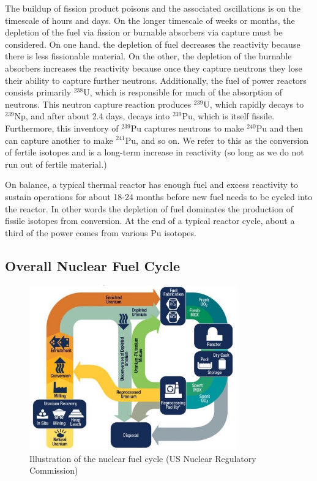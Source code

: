 The buildup of fission product poisons and the associated oscillations is on the timescale of hours and days. On the longer timescale of weeks or months, the depletion of the fuel via fission or burnable absorbers via capture must be considered. On one hand. the depletion of fuel decreases the reactivity because there is less fissionable material. On the other, the depletion of the burnable absorbers increases the reactivity because once they capture neutrons they lose their ability to capture further neutrons. Additionally, the fuel of power reactors consists primarily $^{238}$U, which is responsible for much of the absorption of neutrons. This neutron capture reaction produces $^{239}$U, which rapidly decays to $^{239}$Np, and after about 2.4 days, decays into $^{239}$Pu, which is itself fissile. Furthermore, this inventory of $^{239}$Pu captures neutrons to make $^{240}$Pu and then can capture another to make $^{241}$Pu, and so on. We refer to this as the conversion of fertile isotopes and is a long-term increase in reactivity (so long as we do not run out of fertile material.)

On balance, a typical thermal reactor has enough fuel and excess reactivity to sustain operations for about 18-24 months before new fuel needs to be cycled into the reactor. In other words the depletion of fuel dominates the production of fissile isotopes from conversion. At the end of a typical reactor cycle, about a third of the power comes from various Pu isotopes.

\subsection{Overall Nuclear Fuel Cycle}

\begin{figure}[tb!]
\begin{center}
\includegraphics[width=0.8\textwidth]{./Figures/NRCFuelCycle.jpg}
\caption{Illustration of the nuclear fuel cycle (US Nuclear Regulatory Commission)}
\label{Fig:kinetics_nuclearFuelCycle}
\end{center}
\end{figure}

